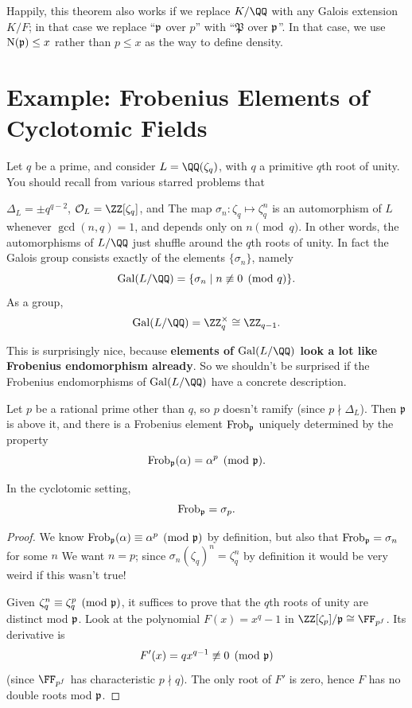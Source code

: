 \begin{remark}
Happily, this theorem also works if we replace $K/\QQ$ with any Galois extension $K/F$;
in that case we replace ``$\mathfrak p$ over $p$'' with ``$\mathfrak P$ over $\mathfrak p$''.
In that case, we use $\operatorname{N}(\mathfrak p) \le x$ rather than $p \le x$ as the way
to define density.
\end{remark}

\section{Example: Frobenius Elements of Cyclotomic Fields}
Let $q$ be a prime, and consider $L = \QQ(\zeta_q)$, with $q$ a primitive $q$th root of unity.
You should recall from various starred problems that
\begin{itemize}
	\ii $\Delta_L = \pm q^{q-2}$,
	\ii $\OO_L = \ZZ[\zeta_q]$, and
	\ii The map $\sigma_n : \zeta_q \mapsto \zeta_q^n$ is an automorphism of $L$ whenever $\gcd(n,q)=1$,
	and depends only on $n \pmod q$.
	In other words, the automorphisms of $L/\QQ$ just shuffle around the $q$th roots of unity.
	In fact the Galois group consists exactly of the elements $\{\sigma_n\}$, namely
	\[ \Gal(L/\QQ) = \{ \sigma_n \mid n \not\equiv 0 \pmod q \}. \]
	As a group, \[ \Gal(L/\QQ) = \Zm q \cong \ZZ_{q-1}. \]
\end{itemize}
This is surprisingly nice, because \textbf{elements of $\Gal(L/\QQ)$ look a lot like Frobenius endomorphism already}.
So we shouldn't be surprised if the Frobenius endomorphisms of $\Gal(L/\QQ)$ have a concrete description.

Let $p$ be a rational prime other than $q$, so $p$ doesn't ramify (since $p \nmid \Delta_L$).
Then $\mathfrak p$ is above it, and there is a Frobenius element $\mathrm{Frob}_\mathfrak p$ uniquely determined by the property
\[ \mathrm{Frob}_\mathfrak p(\alpha) = \alpha^p \pmod{\mathfrak p}. \]

\begin{lemma}
	\label{lem:cyclo_frob}
	In the cyclotomic setting, \[ \mathrm{Frob}_\mathfrak p = \sigma_p. \]
\end{lemma}
\begin{proof}
	We know $\mathrm{Frob}_\mathfrak p(\alpha) \equiv \alpha^p \pmod{\mathfrak p}$ by definition,
	but also that $\mathrm{Frob}_\mathfrak p = \sigma_n$ for some $n$
	We want $n=p$; since $\sigma_n(\zeta_q)^n = \zeta_q^n$ by definition
	it would be very weird if this wasn't true!
	
	Given $\zeta_q^n \equiv \zeta_q^p \pmod{\mathfrak p}$, it suffices to
	prove that the $q$th roots of unity are distinct mod $\mathfrak p$.
	Look at the polynomial $F(x) = x^q-1$ in $\ZZ[\zeta_p]/\pp \cong \FF_{p^f}$.
	Its derivative is \[ F'(x) = qx^{q-1} \not\equiv 0 \pmod{\mathfrak p} \]
	(since $\FF_{p^f}$ has characteristic $p \nmid q$).
	The only root of $F'$ is zero, hence $F$ has no double roots mod $\mathfrak p$.
\end{proof}

